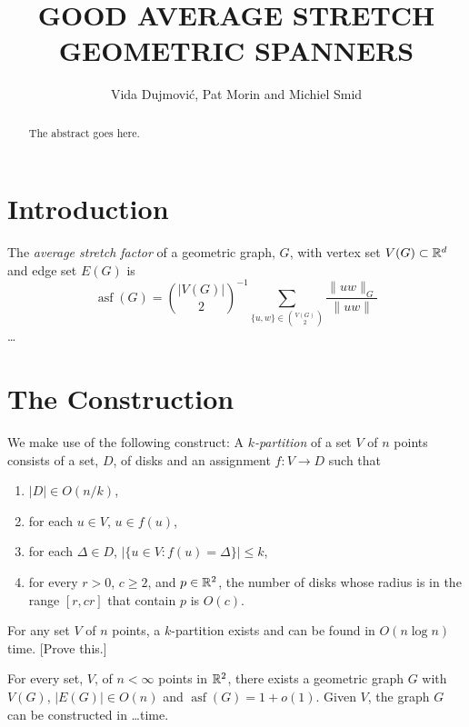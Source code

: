 \documentclass{patmorin}
\title{\MakeUppercase{Good Average Stretch Geometric Spanners}}
\author{Vida Dujmovi\'c, Pat Morin and Michiel Smid}
\DeclareMathOperator{\asf}{asf}
\begin{document}
\begin{titlepage}
\maketitle

\begin{abstract}
  The abstract goes here.
\end{abstract}

\end{titlepage}

\section{Introduction}

The \emph{average stretch factor} of a geometric graph, $G$, with vertex
set $V(G)\subset \mathbb{R}^d$ and edge set $E(G)$ is
\[
    \asf(G) = \binom{|V(G)|}{2}^{-1}\sum_{\{u,w\}\in\binom{V(G)}{2}}\frac{\|uw\|_G}{\|uw\|}
\]
\ldots

\section{The Construction}

We make use of the following construct:  A \emph{$k$-partition} of a
set $V$ of $n$ points consists of a set, $D$,
of disks and an assignment $f:V\to D$ such that
\begin{enumerate}
  \item $|D|\in O(n/k)$,
  \item for each $u\in V$, $u\in f(u)$,
  \item for each $\Delta\in D$, $|\{u\in V: f(u)=\Delta\}|\le k$,
  \item for every $r> 0$, $c\ge 2$, and $p\in\mathbb{R}^2$, the number of disks
   whose radius is in the range $[r,cr]$ that contain $p$ is $O(c)$.
\end{enumerate}
For any set $V$ of $n$ points, a $k$-partition exists and can be found
in $O(n\log n)$ time. [Prove this.]

\begin{thm}
  For every set, $V$, of $n<\infty$ points in $\mathbb{R}^2$, there exists a
  geometric graph $G$ with $V(G)$, $|E(G)|\in O(n)$ and $\asf(G)=1+o(1)$.
  Given $V$, the graph $G$ can be constructed in \ldots time.
\end{thm}
\end{document}
